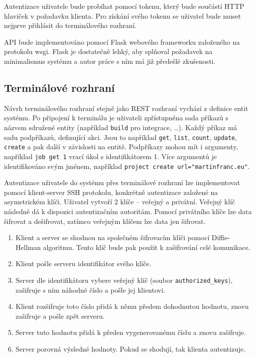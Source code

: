 Autentizace uživatele bude probíhat pomocí tokenu, který bude součástí HTTP hlaviček v požadavku klienta.
Pro získání svého tokenu se uživatel bude muset nejprve přihlásit do terminálového rozhraní.

API bude implementováno pomocí Flask webového frameworku založeného na protokolu wsgi.
Flask je dostatečně lehký, aby splňoval požadavek na minimalismus systému a autor práce s ním má již předešlé zkušenosti.

\subsection{Terminálové rozhraní}

Návrh terminálového rozhraní stejně jako REST rozhraní vychází z definice entit systému.
Po připojení k terminálu je uživateli zpřístupněna sada příkazů s názvem sdružené entity (například \verb|build| pro integrace, \ldots).
Každý příkaz má sadu podpříkazů, definující akci.
Jsou to například \verb|get|, \verb|list|, \verb|count|, \verb|update|, \verb|create| a pak další v závislosti na entitě.
Podpříkazy mohou mít i argumenty, například \verb|job get 1| vrací úkol s identifikátorem 1.
Více argumentů je identifikováno svým jménem, například \verb|project create url="martinfranc.eu"|.

Autentizace uživatele do systému přes terminálové rozhraní lze implementovat pomocí klient-server SSH protokolu, konkrétně autentizace založené na asymetrickém klíči.
Uživatel vytvoří 2 klíče -- veřejný a privátní.
Veřejný klíč následně dá k dispozici autentizačním autoritám.
Pomocí privátního klíče lze data šifrovat a dešifrovat, zatímco veřejným klíčem lze data jen šifrovat.

\begin{enumerate}
    \item Klient a server se shodnou na společném šifrovacím klíči pomocí Diffie-Hellman algoritmu.
    Tento klíč bude pak použit k zašifrování celé komunikace.
    \item Klient pošle serveru identifikátor svého klíče.
    \item Server dle identifikátoru vybere veřejný klíč (soubor \verb|authorized_keys|), zašifruje s ním náhodné číslo a pošle jej klientovi.
    \item Klient rozšifruje toto číslo přidá k němu předem dohodnutou hodnotu, znovu zašifruje a pošle zpět serveru.
    \item Server tuto hodnotu přidá k předen vygenerovanému číslu a znovu zašifruje.
    \item Server porovná výsledné hodnoty. Pokud se shodují, tak klienta autentizuje.
\end{enumerate}

